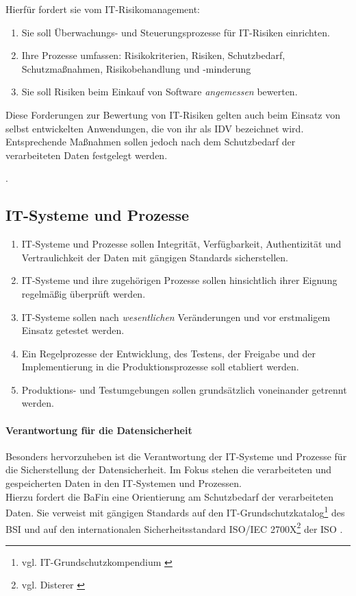 Hierfür fordert sie vom IT-Risikomanagement:
\begin{enumerate}
    \item Sie soll Überwachungs- und Steuerungsprozesse für IT-Risiken einrichten.
    \item Ihre Prozesse umfassen: Risikokriterien, Risiken, Schutzbedarf, Schutzmaßnahmen, Risikobehandlung und -minderung
    \item Sie soll Risiken beim Einkauf von Software \emph{angemessen} bewerten.
\end{enumerate}
Diese Forderungen zur Bewertung von IT-Risiken gelten auch beim Einsatz von selbst entwickelten Anwendungen, die von ihr als \ac{IDV} bezeichnet wird. Entsprechende Maßnahmen sollen jedoch nach dem Schutzbedarf der verarbeiteten Daten festgelegt werden.

\cite{MaRisk:2017}.

\subsection{IT-Systeme und Prozesse}
\begin{enumerate}
    \item IT-Systeme und Prozesse sollen Integrität, Verfügbarkeit, Authentizität und Vertraulichkeit der Daten mit gängigen Standards sicherstellen.
    \item IT-Systeme und ihre zugehörigen Prozesse sollen hinsichtlich ihrer Eignung regelmäßig überprüft werden.
    \item IT-Systeme sollen nach \emph{wesentlichen} Veränderungen und vor erstmaligem Einsatz getestet werden.
    \item Ein Regelprozesse der Entwicklung, des Testens, der Freigabe und der Implementierung in die Produktionsprozesse soll etabliert werden. 
    \item Produktions- und Testumgebungen sollen grundsätzlich voneinander getrennt werden.
\end{enumerate}
%
\paragraph{Verantwortung für die Datensicherheit}
Besonders hervorzuheben ist die Verantwortung der IT-Systeme und Prozesse für die Sicherstellung der Datensicherheit.  Im Fokus stehen die verarbeiteten und gespeicherten Daten in den IT-Systemen und Prozessen.
\medskip
\\
Hierzu fordert die BaFin eine Orientierung am Schutzbedarf der verarbeiteten Daten. Sie verweist mit gängigen Standards auf den IT-Grundschutzkatalog\footnote{vgl. IT-Grundschutzkompendium \cite{IT-Grundschutz:2020}} des \ac{BSI} und auf den internationalen Sicherheitsstandard ISO/IEC 2700X\footnote{vgl. Disterer \cite{Disterer2013}} der \ac{ISO} \cite{MaRisk:2017, MaRiskErläuterungen:2017}.

